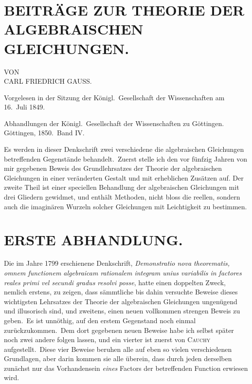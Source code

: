 \documentclass[12pt,a4paper]{article}
\theoremstyle{plain}
\begin{document}
\section*{BEITRÄGE ZUR THEORIE DER ALGEBRAISCHEN GLEICHUNGEN.}

VON\\
CARL FRIEDRICH GAUSS.

\medskip

Vorgelesen in der Sitzung der Königl.\ Gesellschaft der Wissenschaften am 16.\ Juli 1849.

\medskip

Abhandlungen der Königl.\ Gesellschaft der Wissenschaften zu Göttingen.\\
Göttingen, 1850.\ Band IV.

\medskip

Es werden in dieser Denkschrift zwei verschiedene die algebraischen Gleichungen betreffenden Gegenstände behandelt.\ Zuerst stelle ich den vor fünfzig
Jahren von mir gegebenen Beweis des Grundlehrsatzes der Theorie der algebraischen Gleichungen in einer veränderten Gestalt und mit erheblichen Zusätzen auf.
Der zweite Theil ist einer speciellen Behandlung der algebraischen Gleichungen
mit drei Gliedern gewidmet, und enthält Methoden, nicht bloss die reellen, sondern auch die imaginären Wurzeln solcher Gleichungen mit Leichtigkeit zu bestimmen.

\section*{ERSTE ABHANDLUNG.}

Die im Jahre 1799 erschienene Denkschrift, \textit{Demonstratio nova theorematis,
omnem functionem algebraicam rationalem integram unius variabilis in factores reales primi vel secundi gradus resolvi posse}, hatte einen doppelten Zweck, nemlich erstens, zu zeigen, dass sämmtliche bis dahin versuchte Beweise dieses wichtigsten
Lehrsatzes der Theorie der algebraischen Gleichungen ungenügend und illusorisch
sind, und zweitens, einen neuen vollkommen strengen Beweis zu geben.\ Es ist
unnöthig, auf den erstem Gegenstand noch einmal zurückzukommen.\ Dem dort
gegebenen neuen Beweise habe ich selbst später noch zwei andere folgen lassen, und ein vierter ist zuerst von \textsc{Cauchy} aufgestellt.\ Diese vier Beweise beruhen alle auf eben so vielen verschiedenen Grundlagen, aber darin kommen sie
alle überein, dass durch jeden derselben zunächst nur das Vorhandensein \textit{eines}
Factors der betreffenden Function erwiesen wird.
\end{document}
